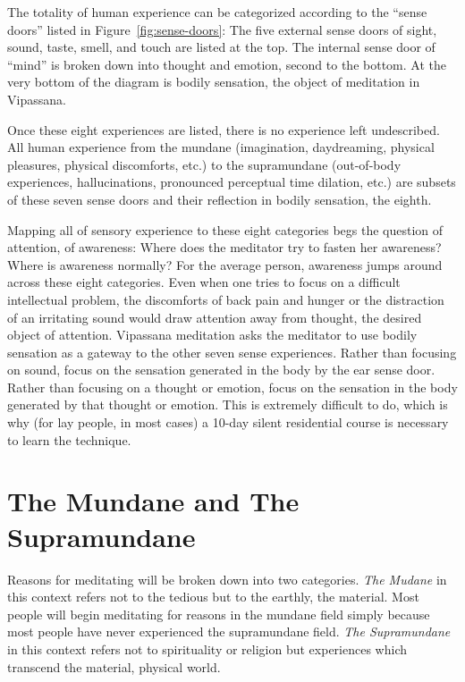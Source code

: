 \documentclass[a4paper, amsfonts, amssymb, amsmath, reprint, showkeys, nofootinbib, twoside]{revtex4-1}
\begin{document}
The totality of human experience can be categorized according to the ``sense doors''
listed in Figure~\ref{fig:sense-doors}: The five external sense doors of sight, sound,
taste, smell, and touch are listed at the top. The internal sense door of ``mind'' is
broken down into thought and emotion, second to the bottom. At the very bottom of the
diagram is bodily sensation, the object of meditation in Vipassana.

Once these eight experiences are listed, there is no experience left undescribed. All
human experience from the mundane (imagination, daydreaming, physical pleasures,
physical discomforts, etc.) to the supramundane (out-of-body experiences,
hallucinations, pronounced perceptual time dilation, etc.) are subsets of these seven
sense doors and their reflection in bodily sensation, the eighth.

Mapping all of sensory experience to these eight categories begs the question of
attention, of awareness: Where does the meditator try to fasten her awareness? Where
is awareness normally? For the average person, awareness jumps around across these
eight categories. Even when one tries to focus on a difficult intellectual problem,
the discomforts of back pain and hunger or the distraction of an irritating sound
would draw attention away from thought, the desired object of attention. Vipassana
meditation asks the meditator to use bodily sensation as a gateway to the other seven
sense experiences. Rather than focusing on sound, focus on the sensation generated in
the body by the ear sense door. Rather than focusing on a thought or emotion, focus
on the sensation in the body generated by that thought or emotion. This is extremely
difficult to do, which is why (for lay people, in most cases) a 10-day silent
residential course \cite{dhamma} is necessary to learn the technique.


\section{The Mundane and The Supramundane}

Reasons for meditating will be broken down into two categories. \textit{The Mudane}
in this context refers not to the tedious but to the earthly, the material. Most people will begin
meditating for reasons in the mundane field simply because most people have never
experienced the supramundane field. \textit{The Supramundane} in this context refers not to
spirituality or religion but experiences which transcend the material, physical world.
\end{document}

